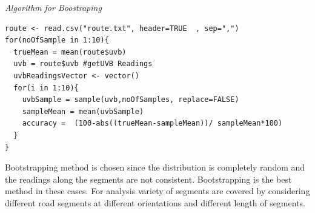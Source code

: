 \documentclass[10pt]{sigplan-proc-varsize}
\begin{document}
\begin{center}
{ 	

\begin{center} 
{\small \sl Algorithm for Boostraping \\}
\end{center} }
\end{center}

\lstset{caption=R Code for Bootstraping,breaklines=true, tabsize=4,    
        frame=single}
\begin{lstlisting}
route <- read.csv("route.txt", header=TRUE  , sep=",")
for(noOfSample in 1:10){  
  trueMean = mean(route$uvb)
  uvb = route$uvb #getUVB Readings
  uvbReadingsVector <- vector()
  for(i in 1:10){
    uvbSample = sample(uvb,noOfSamples, replace=FALSE)
    sampleMean = mean(uvbSample)
    accuracy =  (100-abs((trueMean-sampleMean))/ sampleMean*100)
  }
}\end{lstlisting}

Bootstrapping method is chosen since the distribution is completely random and the readings along the segments are not consistent. Bootstrapping is the best method in these cases. For analysis variety of segments are covered by considering different road segments at different orientations and different length of segments. 
\end{document}
